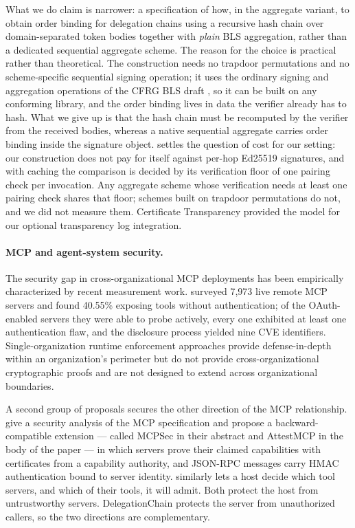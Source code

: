 \documentclass[11pt,a4paper]{article}
\begin{document}
What we do claim is narrower: a specification of how, in the aggregate
variant, to obtain order binding for delegation chains using a recursive
hash chain over
domain-separated token bodies together with \emph{plain} BLS
aggregation, rather than a dedicated sequential aggregate scheme. The
reason for the choice is practical rather than theoretical. The
construction needs no trapdoor permutations and no scheme-specific
sequential signing operation; it uses the ordinary signing and
aggregation operations of the CFRG BLS draft
\citep{ietf-bls-signature}, so it can be built on any conforming
library, and the order binding lives in data the verifier already has to
hash. What we give up is that the hash chain must be recomputed by the
verifier from the received bodies, whereas a native sequential aggregate
carries order binding inside the signature object. 
settles the question of cost for our setting: our construction does not
pay for itself against per-hop Ed25519 signatures, and with caching the
comparison is decided by its verification floor of one pairing check
per invocation. Any aggregate scheme whose verification needs at least
one pairing check shares that floor; schemes built on trapdoor
permutations \citep{lmrs2004seqagg} do not, and we did not measure
them. Certificate Transparency \citep{rfc9162}
provided the model for our optional transparency log integration.

\paragraph{MCP and agent-system security.}
The security gap in cross-organizational MCP deployments has been
empirically characterized by recent measurement work.
\citet{zhou2026mcpauth} surveyed 7,973 live remote MCP servers and found
40.55\% exposing tools without authentication; of the OAuth-enabled
servers they were able to probe actively, every one exhibited at least
one authentication flaw, and the disclosure process yielded nine CVE
identifiers. Single-organization runtime enforcement approaches
\citep{buhler2026agentbound} provide defense-in-depth within an
organization's perimeter but do not provide cross-organizational
cryptographic proofs and are not designed to extend across
organizational boundaries.

A second group of proposals secures the other direction of the MCP
relationship. \citet{maloyan2026breaking} give a security analysis of
the MCP specification and propose a backward-compatible extension ---
called MCPSec in their abstract and AttestMCP in the body of the paper
--- in which servers prove their claimed capabilities with certificates
from a capability authority, and JSON-RPC messages carry HMAC
authentication bound to server identity. \citet{metere2026admission}
similarly lets a host decide which tool servers, and which of their
tools, it will admit. Both protect the host from untrustworthy servers.
DelegationChain protects the server from unauthorized callers, so the
two directions are complementary.
\end{document}
